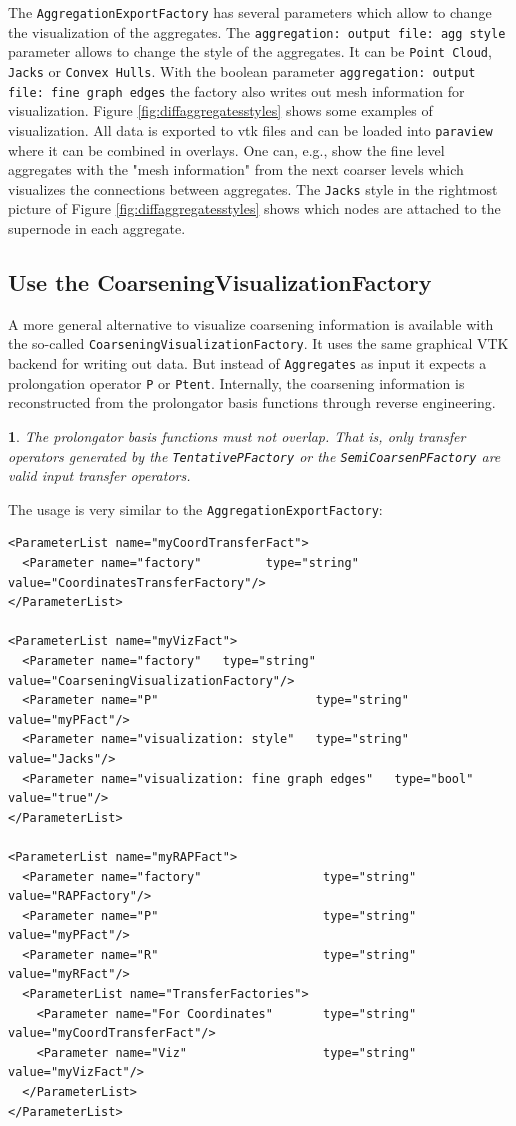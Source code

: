 \documentclass[10pt,fleqn]{book}
\newtheorem*{mycomment}{\ding{42}}
\begin{document}
The \verb|AggregationExportFactory| has several parameters which allow to change the visualization of the aggregates. The
\verb|aggregation: output file: agg style| parameter allows to change the style of the aggregates. It can be \verb|Point Cloud|, \verb|Jacks| or \verb|Convex Hulls|. With the boolean parameter \verb|aggregation: output file: fine graph edges| the factory also writes out mesh information for visualization. Figure \ref{fig:diffaggregatesstyles} shows some examples of visualization. All data is exported to vtk files and can be loaded into \verb|paraview| where it can be combined in overlays. One can, e.g., show the fine level aggregates with the "mesh information" from the next coarser levels which visualizes the connections between aggregates. The \verb|Jacks| style in the rightmost picture of Figure \ref{fig:diffaggregatesstyles} shows which nodes are attached to the supernode in each aggregate.


\subsection{Use the CoarseningVisualizationFactory}

A more general alternative to visualize coarsening information is available with the so-called \verb|CoarseningVisualizationFactory|. It uses the same graphical VTK backend for writing out data. But instead of \verb|Aggregates| as input it expects a prolongation operator \verb|P| or \verb|Ptent|. Internally, the coarsening information is reconstructed from the prolongator basis functions through reverse engineering.

\begin{mycomment}
The prolongator basis functions must not overlap. That is, only transfer operators generated by the \verb|TentativePFactory| or the \verb|SemiCoarsenPFactory| are valid input transfer operators.
\end{mycomment}

The usage is very similar to the \verb|AggregationExportFactory|:
\begin{lstlisting}
<ParameterList name="myCoordTransferFact">
  <Parameter name="factory"         type="string" value="CoordinatesTransferFactory"/>
</ParameterList>

<ParameterList name="myVizFact">
  <Parameter name="factory"   type="string" value="CoarseningVisualizationFactory"/>
  <Parameter name="P"                      type="string" value="myPFact"/>
  <Parameter name="visualization: style"   type="string" value="Jacks"/>
  <Parameter name="visualization: fine graph edges"   type="bool" value="true"/>
</ParameterList>

<ParameterList name="myRAPFact">
  <Parameter name="factory"                 type="string" value="RAPFactory"/>
  <Parameter name="P"                       type="string" value="myPFact"/>
  <Parameter name="R"                       type="string" value="myRFact"/>
  <ParameterList name="TransferFactories">
    <Parameter name="For Coordinates"       type="string" value="myCoordTransferFact"/>
    <Parameter name="Viz"                   type="string" value="myVizFact"/>
  </ParameterList>
</ParameterList>
\end{lstlisting}
\end{document}
